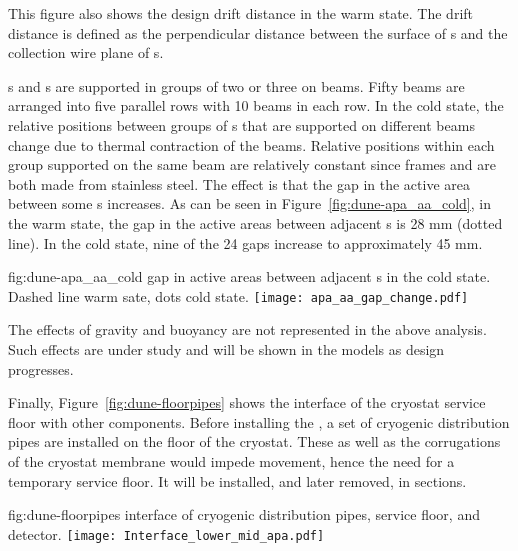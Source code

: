 This figure %
also shows the design drift distance in
the warm state. The drift distance is defined as the perpendicular
distance between the surface of s and the collection wire
plane of s.

s and s are supported in groups of two or three
on  beams. Fifty beams are arranged into five parallel
rows with 10 beams in each row.  In the cold state, the relative
positions between groups of s that are supported on
different beams change due to thermal contraction of the
beams. Relative positions within each group %
supported on the
same beam are relatively constant since  frames and %
 are both made from stainless steel.  The effect is that the gap
in the active area between some s increases.  As can be
seen in Figure~\ref{fig:dune-apa_aa_cold}, in the warm state, the gap
in the active areas between adjacent s is 28 mm (dotted
line). In the cold state, nine of the 24 gaps increase to
approximately 45 mm.
\begin{dunefigure}{fig:dune-apa_aa_cold} 
    { gap in active areas between adjacent s in the cold state. Dashed line warm sate, dots cold state.}
\texttt{[image: apa\_aa\_gap\_change.pdf]}
\end{dunefigure}

The effects of gravity and buoyancy are not represented in the above
analysis. Such effects are under study and will be shown in the models
as design progresses.

Finally, Figure~\ref{fig:dune-floorpipes} shows the interface of the cryostat 
service floor with other components.  Before installing the , a set of cryogenic distribution pipes  
are installed on the floor of the cryostat. These as well as the corrugations of the cryostat membrane  would impede movement, hence the need for   
a temporary service floor. %
It will be installed, and later removed, in sections. 
\begin{dunefigure}{fig:dune-floorpipes} 
{ interface of cryogenic distribution pipes, service floor, and
  detector.}
\texttt{[image: Interface\_lower\_mid\_apa.pdf]}
\end{dunefigure}


